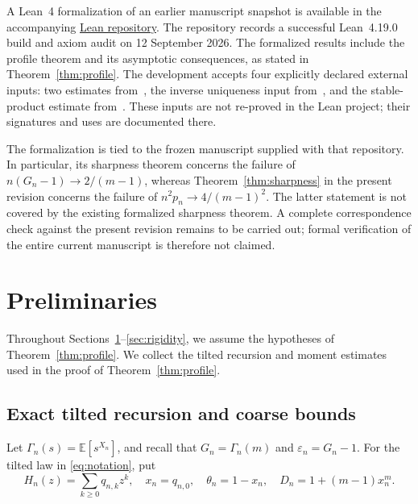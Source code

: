 \documentclass[11pt,letterpaper,reqno]{amsart}
\numberwithin{equation}{section}
\theoremstyle{plain}
\theoremstyle{remark}
\newcommand{\E}{\mathbb E}\newcommand{\Pp}{\mathbb P}
\begin{document}
A Lean~4 formalization of an earlier manuscript snapshot is available in
the accompanying \href{https://github.com/iyalice/DR_Yaglom_lean/tree/2830c58dee0265b8cc71b0dc16acc944cda316a2/lean}{Lean repository}.
The repository records a successful Lean~4.19.0 build and axiom audit on
12 September 2026. The formalized results include the profile theorem
and its asymptotic consequences, as stated in Theorem~\ref{thm:profile}.
The development accepts four explicitly declared external inputs: two
estimates from~\cite{CDHLS}, the inverse uniqueness input from~\cite{Kotani},
and the stable-product estimate from~\cite{CS}. These inputs are not
re-proved in the Lean project; their signatures and uses are documented
there.

The formalization is tied to the frozen manuscript supplied with that
repository. In particular, its sharpness theorem concerns the failure of
$n(G_n-1)\to2/(m-1)$, whereas Theorem~\ref{thm:sharpness} in the present
revision concerns the failure of $n^2p_n\to4/(m-1)^2$. The latter statement
is not covered by the existing formalized sharpness theorem. A complete
correspondence check against the present revision remains to be carried
out; formal verification of the entire current manuscript is therefore
not claimed.

\section{Preliminaries}\label{sec:prelim}
Throughout Sections~\ref{sec:prelim}--\ref{sec:rigidity}, we assume the hypotheses of Theorem~\ref{thm:profile}. We collect the tilted recursion and moment estimates used in the proof of Theorem~\ref{thm:profile}.

\subsection{Exact tilted recursion and coarse bounds}
Let $\Gamma_n(s)=\E[s^{X_n}]$, and recall that $G_n=\Gamma_n(m)$ and $\varepsilon_n=G_n-1$. For the tilted law in \eqref{eq:notation}, put
\[
 H_n(z)=\sum_{k\ge0}q_{n,k}z^k,\quad x_n=q_{n,0},\quad
 \theta_n=1-x_n,\quad D_n=1+(m-1)x_n^m.
\]
\end{document}
